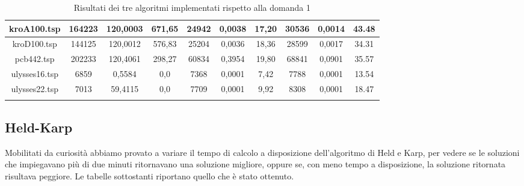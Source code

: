 \begin{center}
\begin{longtable}{|c|c|c|c|c|c|c|c|c|c|}
		kroA100.tsp& 164223 & 120,0003 & 671,65 & 24942 & 0,0038 & 17,20&30536 &0,0014 &43.48 \\ \hline
		kroD100.tsp& 144125 &120,0012 &576,83 &25204 & 0,0036 & 18,36 &28599 &0,0017 &34.31 \\ \hline
		pcb442.tsp& 202233&120,4061 &298,27 & 60834 & 0,3954 & 19,80 &68841 &0,0901 & 35.57\\ \hline
		ulysses16.tsp&6859 &0,5584 & 0,0 & 7368 & 0,0001 & 7,42&7788 & 0,0001 & 13.54\\ \hline
		ulysses22.tsp&7013 &59,4115 &0,0 &  7709 & 0,0001 & 9,92 &8308 &0,0001 &18.47 \\ \hline		 
     \caption{Risultati dei tre algoritmi implementati rispetto alla domanda 1}
     \label{results}
	\end{longtable}
\end{center}

\subsection{Held-Karp}
Mobilitati da curiosità abbiamo provato a variare il tempo di calcolo a disposizione dell'algoritmo di Held e Karp, per vedere se le soluzioni che impiegavano più di due minuti ritornavano una soluzione migliore, oppure se, con meno tempo a disposizione, la soluzione ritornata risultava peggiore. Le tabelle sottostanti riportano quello che è stato ottenuto.
